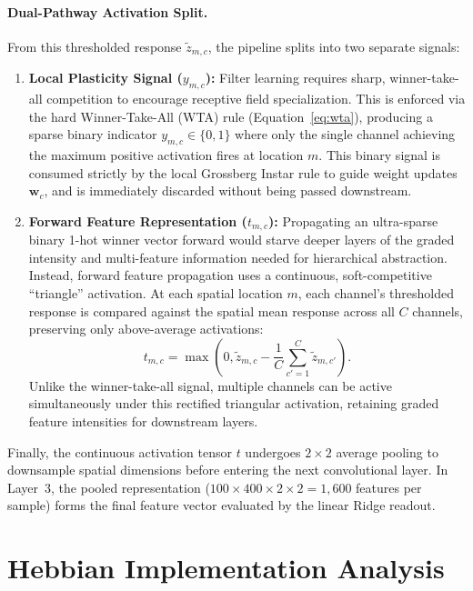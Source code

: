 \documentclass{article}
\begin{document}
    \paragraph{Dual-Pathway Activation Split.}
    From this thresholded response $\tilde{z}_{m,c}$, the pipeline splits into two separate signals:
    \begin{enumerate}
        \item \textbf{Local Plasticity Signal ($y_{m,c}$):} Filter learning requires sharp, winner-take-all competition to encourage receptive field specialization. This is enforced via the hard Winner-Take-All (WTA) rule (Equation~\ref{eq:wta}), producing a sparse binary indicator $y_{m,c} \in \{0, 1\}$ where only the single channel achieving the maximum positive activation fires at location $m$. This binary signal is consumed strictly by the local Grossberg Instar rule to guide weight updates $\mathbf{w}_c$, and is immediately discarded without being passed downstream.
        \item \textbf{Forward Feature Representation ($t_{m,c}$):} Propagating an ultra-sparse binary 1-hot winner vector forward would starve deeper layers of the graded intensity and multi-feature information needed for hierarchical abstraction. Instead, forward feature propagation uses a continuous, soft-competitive ``triangle'' activation. At each spatial location $m$, each channel's thresholded response is compared against the spatial mean response across all $C$ channels, preserving only above-average activations:
        \begin{equation}
        t_{m,c} = \max\left(0, \tilde{z}_{m,c} - \frac{1}{C}\sum_{c'=1}^C \tilde{z}_{m,c'}\right).
        \label{eq:triangle}
        \end{equation}
        Unlike the winner-take-all signal, multiple channels can be active simultaneously under this rectified triangular activation, retaining graded feature intensities for downstream layers.
    \end{enumerate}
    
    Finally, the continuous activation tensor $t$ undergoes $2\times 2$ average pooling to downsample spatial dimensions before entering the next convolutional layer. In Layer~3, the pooled representation ($100 \times 400 \times 2 \times 2 = 1,600$ features per sample) forms the final feature vector evaluated by the linear Ridge readout.

    \section{Hebbian Implementation Analysis}
    
\end{document}
